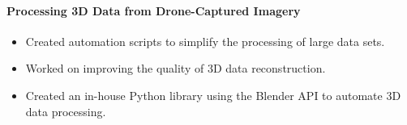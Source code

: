 \paragraph{Processing 3D Data from Drone-Captured Imagery}
\begin{itemize}
\item Created automation scripts to simplify the processing of large data sets.
\item Worked on improving the quality of 3D data reconstruction.
\item Created an in-house Python library using the Blender API to automate 3D data processing.
\end{itemize}